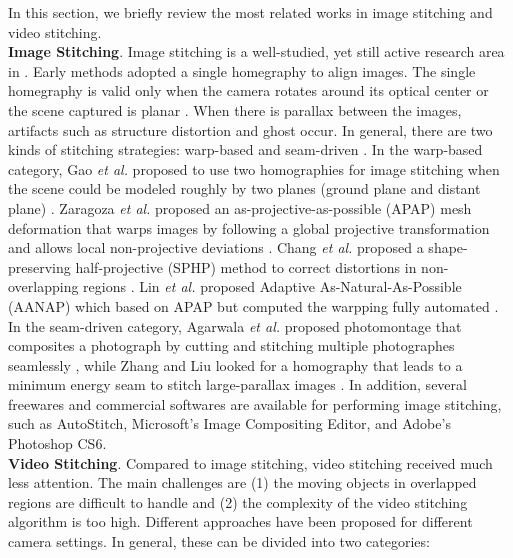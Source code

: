 \documentclass[conference]{IEEEtran}
\begin{document}
In this section, we briefly review the most related works in image stitching and video stitching.\\
{\bf Image Stitching}. Image stitching is a well-studied, yet still active research 
area in \cite{paragios2006handbook, brown2007automatic,hartley2003multiple,lin2011smoothly, chang2014shape, zaragoza2013projective,lin2015adaptive,zhang2014parallax, gao2013seam, agarwala2004interactive,gao2011constructing}. 
Early methods adopted a single homegraphy to align images. The single homegraphy 
is valid only when the camera rotates around its optical center or the scene captured 
is planar \cite{hartley2003multiple}. When there is parallax between the images, 
artifacts such as structure distortion and 
ghost occur. In general, there are two kinds of stitching strategies: 
warp-based \cite{lin2011smoothly, chang2014shape, zaragoza2013projective} and 
seam-driven \cite{zhang2014parallax, gao2013seam, agarwala2004interactive}. In the warp-based category, 
Gao \textit{et al.} proposed to use two homographies for image stitching 
when the scene could be modeled roughly by two planes (ground plane and distant plane) \cite{gao2011constructing}.
Zaragoza \textit{et al.} proposed an as-projective-as-possible (APAP) mesh deformation that warps
images by following a global projective transformation and allows local non-projective 
deviations \cite{zaragoza2013projective}.
Chang \textit{et al.} proposed a shape-preserving half-projective (SPHP) method
to correct distortions in non-overlapping regions \cite{chang2014shape}. 
Lin \textit{et al.} proposed Adaptive As-Natural-As-Possible (AANAP) 
which based on APAP but computed the warpping fully automated \cite{lin2015adaptive}.
In the seam-driven category, Agarwala \textit{et al.}
proposed photomontage that composites a photograph by
cutting and stitching multiple photographes seamlessly \cite{agarwala2004interactive},
while Zhang and Liu looked for a homography that leads to a
minimum energy seam to stitch large-parallax images \cite{zhang2014parallax}.
In addition, several freewares and commercial softwares are available for performing image stitching, such as 
AutoStitch, Microsoft’s Image Compositing Editor, and Adobe's Photoshop CS6.\\
{\bf Video Stitching}. Compared to image stitching, video stitching received much less attention. 
The main challenges are (1) the moving objects in overlapped regions are difficult to handle and (2) the complexity of the video stitching algorithm is too high.
Different approaches have been proposed for different camera settings. In general, these can be divided into two categories: 
\end{document}
